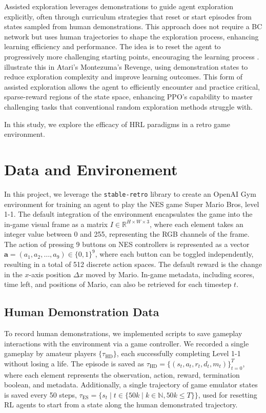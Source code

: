 \documentclass{article}
\begin{document}
Assisted exploration leverages demonstrations to guide agent exploration 
explicitly, often through curriculum strategies that reset or start episodes 
from states sampled from human demonstrations. This approach does not require 
a BC network but uses human trajectories to shape the exploration process, 
enhancing learning efficiency and performance.
The idea is to reset the agent 
to progressively more challenging starting points, encouraging the learning 
process \cite{florensa2018reversecurriculumgenerationreinforcement}. 
\cite{salimans2018learningmontezumasrevengesingle} illustrate this in Atari's 
Montezuma’s Revenge, using demonstration states to reduce exploration 
complexity and improve learning outcomes. This form of assisted exploration 
allows the agent to efficiently encounter and practice critical, sparse-reward 
regions of the state space, enhancing PPO's capability to master challenging 
tasks that conventional random exploration methods struggle with.

In this study, we explore the efficacy of HRL paradigms in a retro game 
environment.


\section{Data and Environement}
In this project, we leverage the \texttt{stable-retro} library to create an OpenAI Gym 
environment for training an agent to play the NES game Super Mario Bros, level 1-1. The 
default integration of the environment encapsulates the game into the in-game visual 
frame as a matrix $I \in \mathbb{R}^{H \times W \times 3}$, where each element takes an 
integer value between 0 and 255, representing the RGB channels of the frame. The action 
of pressing 9 buttons on NES controllers is represented as a vector 
$\mathbf{a} = (a_1, a_2, \dots, a_9) \in \{0, 1\}^9$, where each button can be toggled 
independently, resulting in a total of 512 discrete action spaces. The default reward 
is the change in the $x$-axis position $\Delta x$ moved by Mario. In-game metadata, including 
scores, time left, and positions of Mario, can also be retrieved for each timestep $t$.

\subsection{Human Demonstration Data}
\label{sec:hd_data}
To record human demonstrations, we implemented scripts to save gameplay 
interactions with the environment via a game controller. 
We recorded a single gameplay by amateur players $\{\tau_{\text{HD}}\}$, 
each successfully completing Level 1-1 without losing a life.
The episode is
saved as $\tau_{\text{HD}} = \{(s_t, a_t, r_t, d_t, m_t)\}_{t=0}^{T}$, where each 
element represents the observation, action, reward, termination boolean, and 
metadata.  
Additionally, a single trajectory 
of game emulator states is saved every 50 steps, 
$\tau_{\text{ES}} = \{ s_t \mid t \in \{ 50k \mid k\in \mathbb{N}, 50k \leq T \} \}$,
used for resetting RL agents 
to start from a state along the human demonstrated trajectory.
\end{document}
